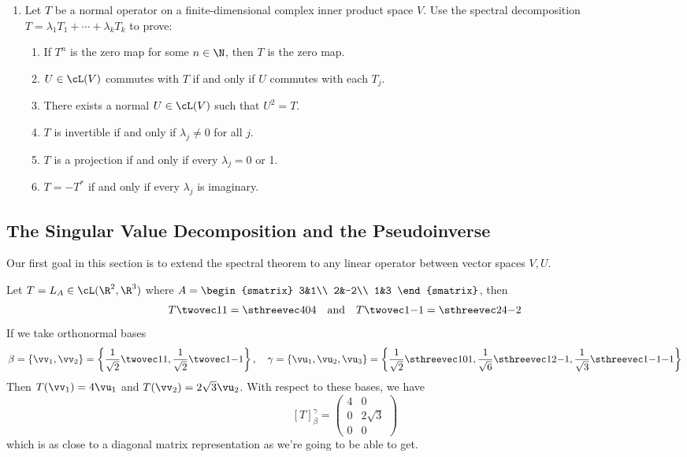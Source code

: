 \begin{exercises}
\begin{enumerate}[label=\thesubsection.\arabic*., align=right]
	\item Let $T$ be a normal operator on a finite-dimensional complex inner product space $V$. Use the spectral decomposition $T=\lambda_1T_1+\cdots+\lambda_kT_k$ to prove:
	\begin{enumerate}
	  \item If $T^n$ is the zero map for some $n\in\N$, then $T$ is the zero map.
	  \item $U\in\cL(V)$ commutes with $T$ if and only if $U$ commutes with each $T_j$.
	  \item There exists a normal $U\in\cL(V)$ such that $U^2=T$.
	  \item $T$ is invertible if and only if $\lambda_j\neq 0$ for all $j$.
	  \item $T$ is a projection if and only if every $\lambda_j=0$ or 1.
	  \item $T=-T^*$ if and only if every $\lambda_j$ is imaginary.
	\end{enumerate}
\end{enumerate}
\end{exercises}\clearpage


\subsection{The Singular Value Decomposition and the Pseudoinverse}

Our first goal in this section is to extend the spectral theorem to any linear operator between vector spaces $V,U$. 

\begin{example}{}{}
Let $T=L_A\in\cL(\R^2,\R^3)$ where $A=\begin{smatrix}
3&1\\
2&-2\\
1&3
\end{smatrix}$, then
\[T\twovec 11=\sthreevec 404\quad\text{and}\quad T\twovec 1{-1}=\sthreevec 24{-2}\]
If we take orthonormal bases
\[\beta=\{\vv_1,\vv_2\}=\left\{\frac 1{\sqrt 2}\twovec 11,\frac 1{\sqrt 2}\twovec 1{-1}\right\},\quad \gamma=\{\vu_1,\vu_2,\vu_3\}=\left\{\frac 1{\sqrt 2}\sthreevec 101,\frac 1{\sqrt 6}\sthreevec 12{-1}, \frac 1{\sqrt 3}\sthreevec 1{-1}{-1}\right\}\]
Then $T(\vv_1)=4\vu_1$ and $T(\vv_2)=2\sqrt 3\vu_2$. With respect to these bases, we have
\[[T]_\beta^\gamma=\begin{pmatrix}
4&0\\
0&2\sqrt 3\\
0&0
\end{pmatrix}\]
which is as close to a diagonal matrix representation as we're going to be able to get.
\end{example}

